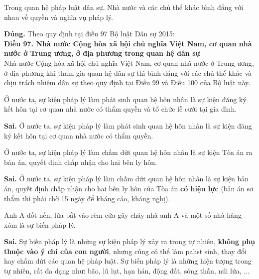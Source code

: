 \begin{ques}
Trong quan hệ pháp luật dân sự, Nhà nước và các chủ thể khác bình đẳng với nhau về quyền và nghĩa vụ pháp lý.
\end{ques}
\begin{ans}
\textbf{Đúng.} Theo quy định tại điều 97 Bộ luật Dân sự 2015:\\
\textbf{Điều 97. Nhà nước Cộng hòa xã hội chủ nghĩa Việt Nam, cơ quan nhà nước ở Trung ương, ở địa phương trong quan hệ dân sự}\\
Nhà nước Cộng hòa xã hội chủ nghĩa Việt Nam, cơ quan nhà nước ở Trung ương, ở địa phương khi tham gia quan hệ dân sự thì bình đẳng với các chủ thể khác và chịu trách nhiệm dân sự theo quy định tại Điều 99 và Điều 100 của Bộ luật này.
\end{ans}

\begin{ques}
Ở nước ta, sự kiện pháp lý làm phát sinh quan hệ hôn nhân là sự kiện đăng ký kết hôn tại cơ quan nhà nước có thẩm quyền và tổ chức lễ cưới tại gia đình.
\end{ques}
\begin{ans}
\textbf{Sai.} Ở nước ta, sự kiện pháp lý làm phát sinh quan hệ hôn nhân là sự kiện đăng ký kết hôn tại cơ quan nhà nước có thẩm quyền.
\end{ans}

\begin{ques}
Ở nước ta, sự kiện pháp lý làm chấm dứt quan hệ hôn nhân là sự kiện Tòa án ra bản án, quyết định chấp nhận cho hai bên ly hôn.
\end{ques}
\begin{ans}
\textbf{Sai.} Ở nước ta, sự kiện pháp lý làm chấm dứt quan hệ hôn nhân là sự kiện bản án, quyết định chấp nhận cho hai bên ly hôn của Tòa án \textbf{có hiệu lực} (bản án sơ thẩm thì phải chờ 15 ngày để kháng cáo, kháng nghị).
\end{ans}

\begin{ques}
Anh A đốt nến, lửa bắt vào rèm cửa gây cháy nhà anh A và một số nhà hàng xóm là sự biến pháp lý.
\end{ques}
\begin{ans}
\textbf{Sai.} Sự biến pháp lý là những sự kiện pháp lý xảy ra trong tự nhiên, \textbf{không phụ thuộc vào ý chí của con người}, nhưng cũng có thể làm pahst sinh, thay đổi hay chấm dứt các quan hệ pháp luật. Sự biến pháp lý là những hiện tượng trong tự nhiên, rất đa dạng như: bão, lũ lụt, hạn hán, động đất, sóng thần, núi lửa, ...
\end{ans}

